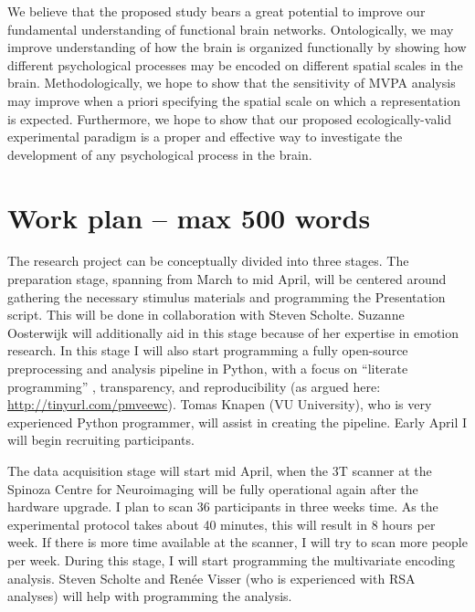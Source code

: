 \documentclass[12pt,a4paper]{article}\usepackage[]{graphicx}\usepackage[]{color}
\begin{document}
We believe that the proposed study bears a great potential to improve our fundamental understanding of functional brain networks. Ontologically, we may improve understanding of how the brain is organized functionally by showing how different psychological processes may be encoded on different spatial scales in the brain. Methodologically, we hope to show that the sensitivity of MVPA analysis may improve when a priori specifying the spatial scale on which a representation is expected. Furthermore, we hope to show that our proposed ecologically-valid experimental paradigm is a proper and effective way to investigate the development of any psychological process in the brain.  

\noindent
\wordcount

\section{Work plan \textmd{– max 500 words}}
The research project can be conceptually divided into three stages. The preparation stage, spanning from March to mid April, will be centered around gathering the necessary stimulus materials and programming the Presentation script. This will be done in collaboration with Steven Scholte. Suzanne Oosterwijk will additionally aid in this stage because of her expertise in emotion research. In this stage I will also start programming a fully open-source preprocessing and analysis pipeline in Python, with a focus on ``literate programming'' \citep{knuth1984}, transparency, and reproducibility (as argued here: \url{http://tinyurl.com/pmveewc}). Tomas Knapen (VU University), who is very experienced Python programmer, will assist in creating the pipeline. Early April I will begin recruiting participants. 

The data acquisition stage will start mid April, when the 3T scanner at the Spinoza Centre for Neuroimaging will be fully operational again after the hardware upgrade. I plan to scan 36 participants in three weeks time. As the experimental protocol takes about 40 minutes, this will result in 8 hours per week. If there is more time available at the scanner, I will try to scan more people per week. During this stage, I will start programming the multivariate encoding analysis. Steven Scholte and Renée Visser (who is experienced with RSA analyses) will help with programming the analysis.
\end{document}
